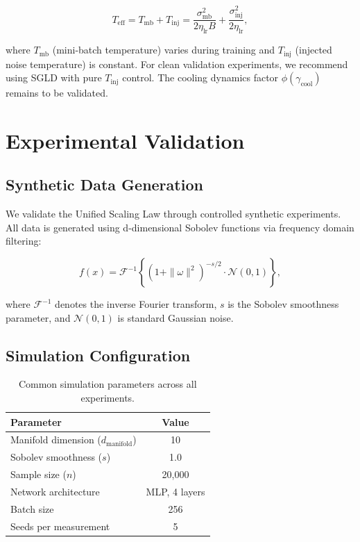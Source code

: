 \documentclass[11pt, a4paper]{article}
\theoremstyle{definition}
\begin{document}
\begin{equation}
T_{\text{eff}} = T_{\text{mb}} + T_{\text{inj}} = \frac{\sigma_{\text{mb}}^2}{2\eta_{\text{lr}}B} + \frac{\sigma_{\text{inj}}^2}{2\eta_{\text{lr}}},
\end{equation}

where $T_{\text{mb}}$ (mini-batch temperature) varies during training and $T_{\text{inj}}$ (injected noise temperature) is constant. For clean validation experiments, we recommend using SGLD with pure $T_{\text{inj}}$ control. The cooling dynamics factor $\phi(\gamma_{\text{cool}})$ remains to be validated.

\section{Experimental Validation}
\label{sec:experiments}

\subsection{Synthetic Data Generation}
\label{sec:synthetic_data}

We validate the Unified Scaling Law through controlled synthetic experiments. All data is generated using d-dimensional Sobolev functions via frequency domain filtering:

\begin{equation}
f(x) = \mathcal{F}^{-1}\left\{(1 + \|\omega\|^2)^{-s/2} \cdot \mathcal{N}(0,1)\right\},
\label{eq:sobolev_generation}
\end{equation}

where $\mathcal{F}^{-1}$ denotes the inverse Fourier transform, $s$ is the Sobolev smoothness parameter, and $\mathcal{N}(0,1)$ is standard Gaussian noise.

\subsection{Simulation Configuration}
\label{sec:simulation_config}

\begin{table}[htbp]
\centering
\caption{Common simulation parameters across all experiments.}
\label{tab:common_params}
\begin{tabular}{lc}
\toprule
\textbf{Parameter} & \textbf{Value} \\
\midrule
Manifold dimension ($d_{\text{manifold}}$) & 10 \\
Sobolev smoothness ($s$) & 1.0 \\
Sample size ($n$) & 20,000 \\
Network architecture & MLP, 4 layers \\
Batch size & 256 \\
Seeds per measurement & 5 \\
\bottomrule
\end{tabular}
\end{table}
\end{document}
